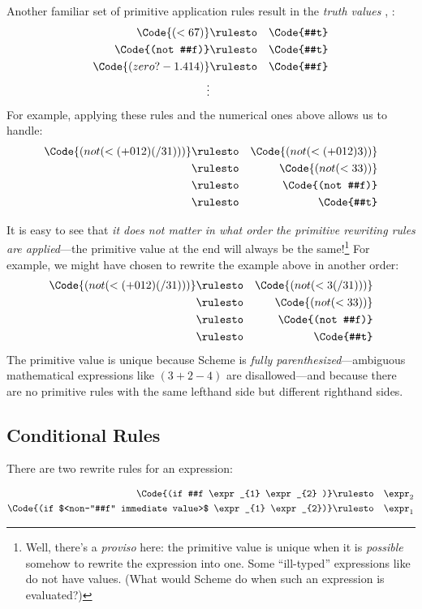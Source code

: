 \documentclass[11pt]{article}
\begin{document}
Another familiar set of primitive application rules result in the {\em
truth values\/} , :
\begin{eqnarray*}
\Code{(< 6 7)}  & \rulesto & \Code{#t}\\
\Code{(not #f)}  & \rulesto & \Code{#t}\\
\Code{(zero? -1.414)}  & \rulesto & \Code{#f}\\
\vdots
\end{eqnarray*}
For example, applying these rules and the numerical ones above allows us
to handle:
\begin{eqnarray*}
\Code{(not (< (+ 0 1 2) (/ 3 1)))}  & \rulesto & \Code{(not (< (+ 0 1 2) 3))}\\
{}&  \rulesto & \Code{(not (< 3 3))}\\
{}&  \rulesto & \Code{(not #f)}\\
{}&  \rulesto & \Code{#t}
\end{eqnarray*}

It is easy to see that {\em it does not matter in what order the primitive
rewriting rules are applied}---the primitive value at the end will always
be the same!\footnote{Well, there's a {\em proviso\/} here: the primitive
value is unique when it is {\em possible} somehow to rewrite the
expression into one.  Some ``ill-typed'' expressions like 
do not have values.  (What would Scheme do when such an expression is
evaluated?)} For example, we might have chosen to rewrite the example
above in another order:
\begin{eqnarray*}
\Code{(not (< (+ 0 1 2) (/ 3 1)))}  & \rulesto & \Code{(not (< 3 (/ 3 1)))}\\
{}&  \rulesto & \Code{(not (< 3 3))}\\
{}&  \rulesto & \Code{(not #f)}\\
{}&  \rulesto & \Code{#t}
\end{eqnarray*}
The primitive value is unique because Scheme is {\em fully
parenthesized}---ambiguous mathematical expressions like $(3 + 2 - 4)$ are
disallowed---and because there are no primitive rules with the same
lefthand side but different righthand sides.

\subsection{Conditional Rules}
There are two rewrite rules for an  expression:
\begin{bnf}
\begin{eqnarray*}
\Code{(if #f \expr_{1} \expr_{2} )} & \rulesto & \expr_{2}\\
\Code{(if $<non-"#f" immediate value>$ \expr_{1} \expr_{2})} & \rulesto & \expr_{1}
\end{eqnarray*}
\end{bnf}
\end{document}
